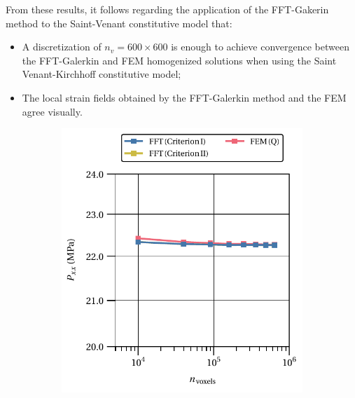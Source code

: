 From these results, it follows regarding the application of the FFT-Gakerin method to the Saint-Venant constitutive model that:
\begin{itemize}
  \item A discretization of \(n_v=600\times 600\) is enough to achieve convergence between the FFT-Galerkin and FEM homogenized solutions when using the Saint Venant-Kirchhoff constitutive model;
  \item The local strain fields obtained by the FFT-Galerkin method and the FEM agree visually.
\end{itemize}

\begin{figure}[hbt]
  \centering
	\begin{subfigure}[b]{0.49\textwidth}
    \centering
    \includegraphics[width=\textwidth]{figures/svk_2D_normal_homo_stress_11_vs_n_voxels}
    \caption{}
    \label{subfig:svk_2D_normal_homo_stress_11_vs_n_voxels}
  \end{subfigure}
  \begin{subfigure}[b]{0.49\textwidth}
    \centering

\end{subfigure}
\end{figure}
